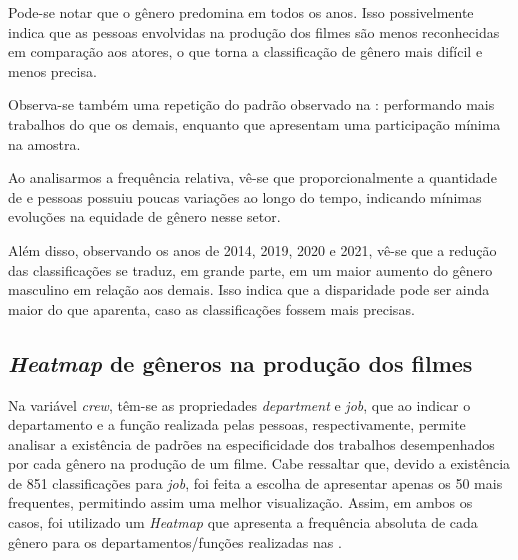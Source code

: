 %

Pode-se notar que o gênero  predomina em todos os anos. Isso possivelmente indica que as pessoas envolvidas na produção dos filmes são menos reconhecidas em comparação aos atores, o que torna a classificação de gênero mais difícil e menos precisa.

Observa-se também uma repetição do padrão observado na :  performando mais trabalhos do que os demais, enquanto que  apresentam uma participação mínima na amostra.

%

Ao analisarmos a frequência relativa, vê-se que proporcionalmente a quantidade de  e pessoas  possuiu poucas variações ao longo do tempo, indicando mínimas evoluções na equidade de gênero nesse setor.

Além disso, observando os anos de 2014, 2019, 2020 e 2021, vê-se que a redução das classificações  se traduz, em grande parte, em um maior aumento do gênero masculino em relação aos demais. Isso indica que a disparidade pode ser ainda maior do que aparenta, caso as classificações fossem mais precisas.


\subsection{\textit{Heatmap} de gêneros na produção dos filmes}
Na variável  \textit{crew}, têm-se as propriedades \textit{department} e \textit{job}, que ao indicar o departamento e a função realizada pelas pessoas, respectivamente, permite analisar a existência de padrões na especificidade dos trabalhos desempenhados por cada gênero na produção de um filme. Cabe ressaltar que, devido a existência de 851 classificações para \textit{job}, foi feita a escolha de apresentar apenas os 50 mais frequentes, permitindo assim uma melhor visualização. Assim, em ambos os casos, foi utilizado um \textit{Heatmap} que apresenta a frequência absoluta de cada gênero para os departamentos/funções realizadas nas . 

%

